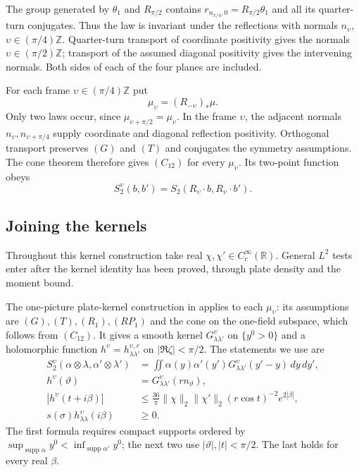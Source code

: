 \documentclass[11pt,letterpaper,reqno]{amsart}
\theoremstyle{definition}
\theoremstyle{remark}
\newcommand{\R}{\mathbb R}\newcommand{\C}{\mathbb C}
\newcommand{\Z}{\mathbb Z}\newcommand{\B}{\mathbb B}
\DeclareMathOperator{\supp}{supp}
\begin{document}
The group generated by $\theta_1$ and $R_{\pi/2}$ contains
$r_{n_{\pi/4},0}=R_{\pi/2}\theta_1$ and all its quarter-turn
conjugates. Thus the law is invariant under the reflections with
normals $n_\upsilon$, $\upsilon\in(\pi/4)\Z$.
Quarter-turn transport of coordinate positivity gives the normals
$\upsilon\in(\pi/2)\Z$; transport of the assumed diagonal positivity
gives the intervening normals. Both sides of each of the four planes
are included.

For each frame $\upsilon\in(\pi/4)\Z$ put
\[
 \mu_\upsilon=(R_{-\upsilon})_*\mu.
\]
Only two laws occur, since $\mu_{\upsilon+\pi/2}=\mu_\upsilon$.
In the frame $\upsilon$, the adjacent normals
$n_\upsilon,n_{\upsilon+\pi/4}$ supply coordinate and diagonal
reflection positivity. Orthogonal transport preserves $(G)$ and $(T)$
and conjugates the symmetry assumptions. The cone theorem therefore
gives $(C_{12})$ for every $\mu_\upsilon$. Its two-point function obeys
\begin{equation}\label{eq:turned-moment}
 S_2^\upsilon(b,b')=S_2(R_\upsilon\cdot b,R_\upsilon\cdot b').
\end{equation}

\subsection{Joining the kernels}

Throughout this kernel construction take real
$\chi,\chi'\in C_c^\infty(\R)$. General $L^2$ tests enter after the
kernel identity has been proved, through plate density and the moment
bound.

The one-picture plate-kernel construction in
\cite[Section~8.4]{QEDCurrent}
applies to each $\mu_\upsilon$: its assumptions are $(G),(T),(R_1),
(RP_1)$ and the cone on the one-field subspace, which follows from
$(C_{12})$. It gives a smooth kernel $G^\upsilon_{\lambda\lambda'}$
on $\{y^0>0\}$ and a holomorphic function
$h^\upsilon=h^{\upsilon,r}_{\lambda\lambda'}$ on
$|\Re\zeta|<\pi/2$. The statements we use are
\begin{align}
 S_2^\upsilon(\alpha\otimes\lambda,\alpha'\otimes\lambda')
 &=\iint\alpha(y)\alpha'(y')G^\upsilon_{\lambda\lambda'}(y'-y)\,dy\,dy',
 \label{eq:ordered-density}\\
 h^\upsilon(\vartheta)&=G^\upsilon_{\lambda\lambda'}(rn_\vartheta),
 \label{eq:angular-chart}\\
 |h^\upsilon(t+i\beta)|&\le\frac{36}{\pi}\|\chi\|_2\|\chi'\|_2
       (r\cos t)^{-2}e^{2|\beta|},\label{eq:angular-bound}\\
 s(\sigma)h^\upsilon_{\lambda\lambda}(i\beta)&\ge0.
 \label{eq:angular-positive}
\end{align}
The first formula requires compact supports ordered by
$\sup_{\supp\alpha}y^0<\inf_{\supp\alpha'}y^0$; the next two use
$|\vartheta|,|t|<\pi/2$. The last holds for every real $\beta$.
\end{document}
